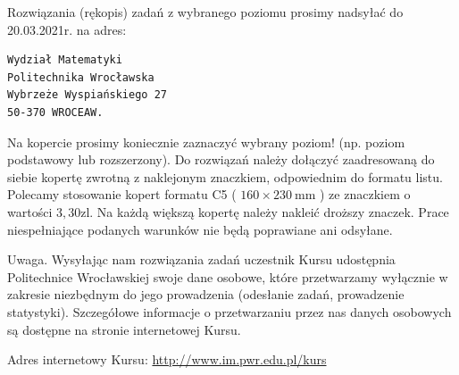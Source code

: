 \documentclass[10pt]{article}
\begin{document}
Rozwiązania (rękopis) zadań z wybranego poziomu prosimy nadsyłać do 20.03.2021r. na adres:

\begin{verbatim}
Wydział Matematyki
Politechnika Wrocławska
Wybrzeże Wyspiańskiego 27
50-370 WROCEAW.
\end{verbatim}

Na kopercie prosimy koniecznie zaznaczyć wybrany poziom! (np. poziom podstawowy lub rozszerzony). Do rozwiązań należy dołączyć zaadresowaną do siebie kopertę zwrotną z naklejonym znaczkiem, odpowiednim do formatu listu. Polecamy stosowanie kopert formatu C5 ( $160 \times 230 \mathrm{~mm}$ ) ze znaczkiem o wartości $3,30 \mathrm{zl}$. Na każdą większą kopertę należy nakleić droższy znaczek. Prace niespełniające podanych warunków nie będą poprawiane ani odsyłane.

Uwaga. Wysyłając nam rozwiązania zadań uczestnik Kursu udostępnia Politechnice Wrocławskiej swoje dane osobowe, które przetwarzamy wyłącznie w zakresie niezbędnym do jego prowadzenia (odesłanie zadań, prowadzenie statystyki). Szczegółowe informacje o przetwarzaniu przez nas danych osobowych są dostępne na stronie internetowej Kursu.

Adres internetowy Kursu: \href{http://www.im.pwr.edu.pl/kurs}{http://www.im.pwr.edu.pl/kurs}
\end{document}
